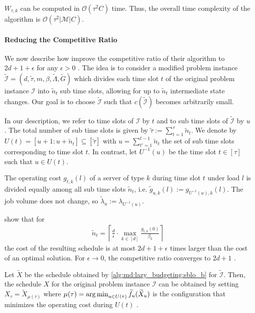$W_{\tau,k}$ can be computed in $\mathcal{O}(\tau^2 C)$ time. Thus, the overall time complexity of the algorithm is $\mathcal{O}(\tau^2 |\mathcal{M}| C)$.

\paragraph{Reducing the Competitive Ratio}

We now describe how \citeauthor*{Albers2021_2} improve the competitive ratio of their algorithm to $2d + 1 + \epsilon$ for any $\epsilon > 0$ \cite{Albers2021_2}. The idea is to consider a modified problem instance $\widetilde{\mathcal{I}} = (d, \widetilde{\tau}, m, \beta, \widetilde{\Lambda}, \widetilde{G})$ which divides each time slot $t$ of the original problem instance $\mathcal{I}$ into $\widetilde{n}_t$ sub time slots, allowing for up to $\widetilde{n}_t$ intermediate state changes. Our goal is to choose $\widetilde{\mathcal{I}}$ such that $c(\widetilde{\mathcal{I}})$ becomes arbitrarily small.

In our description, we refer to time slots of $\mathcal{I}$ by $t$ and to sub time slots of $\widetilde{\mathcal{I}}$ by $u$. The total number of sub time slots is given by $\widetilde{\tau} := \sum_{t=1}^{\tau} \widetilde{n}_t$. We denote by $U(t) = [u+1 : u+\widetilde{n}_t] \subseteq [\widetilde{\tau}]$ with $u = \sum_{t'=1}^{t-1} \widetilde{n}_t$ the set of sub time slots corresponding to time slot $t$. In contrast, let $U^{-1}(u)$ be the time slot $t \in [\tau]$ such that $u \in U(t)$.

The operating cost $g_{t,k}(l)$ of a server of type $k$ during time slot $t$ under load $l$ is divided equally among all sub time slots $\widetilde{n}_t$, i.e. $\widetilde{g}_{u,k}(l) := g_{U^{-1}(u),k}(l)$. The job volume does not change, so $\widetilde{\lambda}_u := \lambda_{U^{-1}(u)}$.

\citeauthor*{Albers2021_2} show that for \begin{align*}
    \widetilde{n}_t = \left\lceil\frac{d}{\epsilon} \cdot \max_{k \in [d]} \frac{g_{t,k}(0)}{\beta_k}\right\rceil
\end{align*} the cost of the resulting schedule is at most $2d + 1 + \epsilon$ times larger than the cost of an optimal solution. For $\epsilon \to 0$, the competitive ratio converges to $2d + 1$ \cite{Albers2021_2}.

Let $\widetilde{X}$ be the schedule obtained by \autoref{alg:md:lazy_budgeting:sblo_b} for $\widetilde{\mathcal{I}}$. Then, the schedule $X$ for the original problem instance $\mathcal{I}$ can be obtained by setting $X_{\tau} = \widetilde{X}_{\mu(\tau)}$ where $\mu(\tau) = \operatorname*{arg\,min}_{u \in U(\tau)} \widetilde{f}_{u}(\widetilde{X}_u)$ is the configuration that minimizes the operating cost during $U(t)$ \cite{Albers2021_2}.

